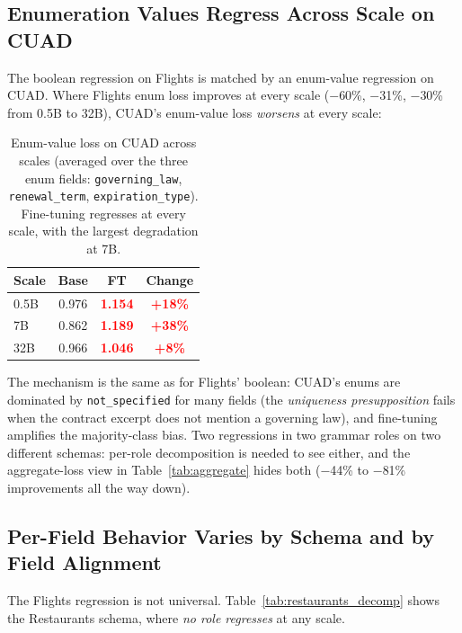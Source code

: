 \documentclass{article}
\newcommand{\regress}[1]{\textcolor{red}{\textbf{#1}}}
\begin{document}
\subsection{Enumeration Values Regress Across Scale on CUAD}

The boolean regression on Flights is matched by an enum-value regression on CUAD. Where Flights enum loss improves at every scale ($-$60\%, $-$31\%, $-$30\% from 0.5B to 32B), CUAD's enum-value loss \emph{worsens} at every scale:

\begin{table}[h]
\centering
\small
\begin{tabular}{lccc}
\toprule
\textbf{Scale} & \textbf{Base} & \textbf{FT} & \textbf{Change} \\
\midrule
0.5B & 0.976 & \regress{1.154} & \regress{+18\%} \\
7B   & 0.862 & \regress{1.189} & \regress{+38\%} \\
32B  & 0.966 & \regress{1.046} & \regress{+8\%} \\
\bottomrule
\end{tabular}
\caption{Enum-value loss on CUAD across scales (averaged over the three enum fields: \texttt{governing\_law}, \texttt{renewal\_term}, \texttt{expiration\_type}). Fine-tuning regresses at every scale, with the largest degradation at 7B.}
\label{tab:enum_cuad}
\end{table}

The mechanism is the same as for Flights' boolean: CUAD's enums are dominated by \texttt{not\_specified} for many fields (the \emph{uniqueness presupposition} fails when the contract excerpt does not mention a governing law), and fine-tuning amplifies the majority-class bias. Two regressions in two grammar roles on two different schemas: per-role decomposition is needed to see either, and the aggregate-loss view in Table~\ref{tab:aggregate} hides both ($-$44\% to $-$81\% improvements all the way down).

\subsection{Per-Field Behavior Varies by Schema and by Field Alignment}\label{sec:cuad}

The Flights regression is not universal. Table~\ref{tab:restaurants_decomp} shows the Restaurants schema, where \emph{no role regresses} at any scale.
\end{document}

